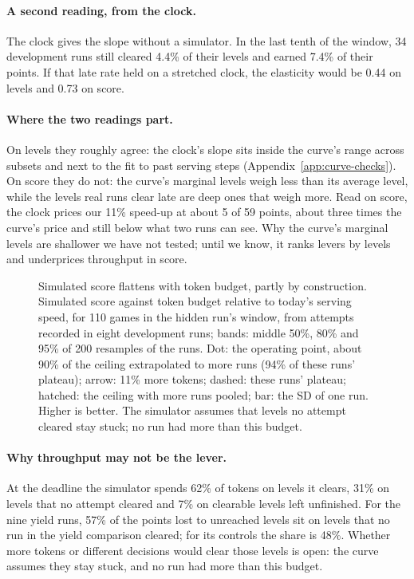 \paragraph{A second reading, from the clock.}
The clock gives the slope without a simulator. %
In the last tenth of the window, 34 development runs still cleared 4.4\% of their levels and earned 7.4\% of their points. %
If that late rate held on a stretched clock, the elasticity would be 0.44 on levels and 0.73 on score. %

\paragraph{Where the two readings part.}
On levels they roughly agree: the clock's slope sits inside the curve's range across subsets and next to the fit to past serving steps (Appendix~\ref{app:curve-checks}). %
On score they do not: the curve's marginal levels weigh less than its average level, while the levels real runs clear late are deep ones that weigh more. %
Read on score, the clock prices our 11\% speed-up at about 5 of 59 points, about three times the curve's price and still below what two runs can see. %
Why the curve's marginal levels are shallower we have not tested; until we know, it ranks levers by levels and underprices throughput in score. %

\begin{figure}[t]
\centering
{}
\caption{Simulated score flattens with token budget, partly by construction. Simulated score against token budget relative to today's serving speed, for 110 games in the hidden run's window, from attempts recorded in eight development runs; bands: middle 50\%, 80\% and 95\% of 200 resamples of the runs. Dot: the operating point, about 90\% of the ceiling extrapolated to more runs (94\% of these runs' plateau); arrow: 11\% more tokens; dashed: these runs' plateau; hatched: the ceiling with more runs pooled; bar: the SD of one run. Higher is better. The simulator assumes that levels no attempt cleared stay stuck; no run had more than this budget.}\label{fig:budget} %
\end{figure}

\paragraph{Why throughput may not be the lever.}
At the deadline the simulator spends 62\% of tokens on levels it clears, 31\% on levels that no attempt cleared and 7\% on clearable levels left unfinished. %
For the nine yield runs, 57\% of the points lost to unreached levels sit on levels that no run in the yield comparison cleared; for its controls the share is 48\%. %
Whether more tokens or different decisions would clear those levels is open: the curve assumes they stay stuck, and no run had more than this budget.


